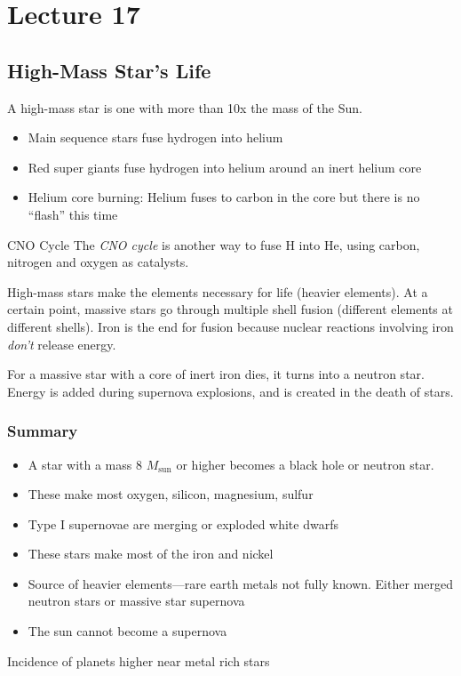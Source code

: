 \documentclass[class=article, crop=false]{standalone}
\begin{document}
  \section{Lecture 17}
  \subsection{High-Mass Star's Life}
  A high-mass star is one with more than 10x the mass of the Sun.
  \begin{itemize}
    \item Main sequence stars fuse hydrogen into helium
    \item Red super giants fuse hydrogen into helium around an inert helium core
    \item Helium core burning: Helium fuses to carbon in the core but there is no ``flash'' this time
  \end{itemize}
  \begin{definition}{CNO Cycle}
    The \emph{CNO cycle} is another way to fuse H into He, using carbon, nitrogen and oxygen as catalysts.
  \end{definition}
  High-mass stars make the elements necessary for life (heavier elements). At a certain point, massive stars go through multiple shell fusion (different elements at different shells). Iron is the end for fusion because nuclear reactions involving iron \emph{don't} release energy. \par
  For a massive star with a core of inert iron dies, it turns into a neutron star. Energy is added during supernova explosions, and is created in the death of stars.
  \subsubsection{Summary}
  \begin{itemize}
    \item A star with a mass $8$ $M_\text{sun}$ or higher becomes a black hole or neutron star.
    \item These make most oxygen, silicon, magnesium, sulfur
    \item Type I supernovae are merging or exploded white dwarfs
    \item These stars make most of the iron and nickel
    \item Source of heavier elements---rare earth metals not fully known. Either merged neutron stars or massive star supernova
    \item The sun cannot become a supernova
  \end{itemize}
  Incidence of planets higher near metal rich stars
\end{document}

